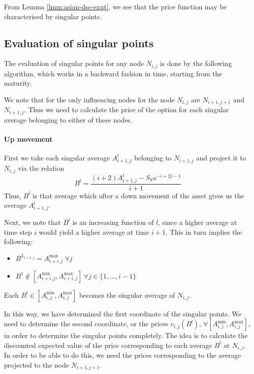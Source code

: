 \begin{rem}
	From Lemma \ref{lmm:asian-dsc-expt}, we see that the price function may be characterised by singular points.
\end{rem}



\subsection{Evaluation of singular points}
\label{subsec:asian-eu-eval}

The evaluation of singular points for any node $ N_{i,j} $ is done by the following algorithm, which works in a backward fashion in time, starting from the maturity.

We note that for the only influencing nodes for the node $ N_{i,j} $ are $ N_{i+1,j+1} $ and $ N_{i+1,j} $. Thus we need to calculate the price of the option for each singular average belonging to either of these nodes.


\paragraph{Up movement}

First we take each singular average $ A_{i+1,j}^l $ belonging to $ N_{i+1,j} $ and project it to $ N_{i,j} $ via the relation
\begin{equation}
	\label{eq:asian-proj-up}
	B^l = \frac{ ( i+2) A_{i+1,j}^l - S_0 u^{-i+2j-1} }{ i+1 }
\end{equation}
Thus, $ B^l $ is that average which after a down movement of the asset gives us the average $ A_{i+1,j}^l $.

Next, we note that $ B^l $ is an increasing function of $ l $, since a higher average at time step $ i $ would yield a higher average at time $ i+1 $. This in turn implies the following:
\begin{itemize}
\item $ B^{L_{i+1,j}} = A_{i+i,j}^{\max} \; \forall j $
\item $ B^1 \notin \left[ A_{i+i,j}^{\min}, A_{i+i,j}^{\max} \right] \ \forall j \in \{1, \dots, i-1 \} $
\end{itemize}
Each $ B^l \in \left[ A_{i,j}^{\min}, A_{i,j}^{\max} \right] $ becomes the singular average of $ N_{i,j} $.

In this way, we have determined the first coordinate of the singular points. We need to determine the second coordinate, or the prices $ v_{i,j}(B^l) $, $ \forall \left[ A_{i,j}^{\min}, A_{i,j}^{\max} \right] $, in order to determine the singular points completely. The idea is to calculate the discounted expected value of the price corresponding to each average $ B^l $ at $ N_{i,j} $. In order to be able to do this, we need the prices corresponding to the average projected to the node $ N_{i+1,j+1} $.

